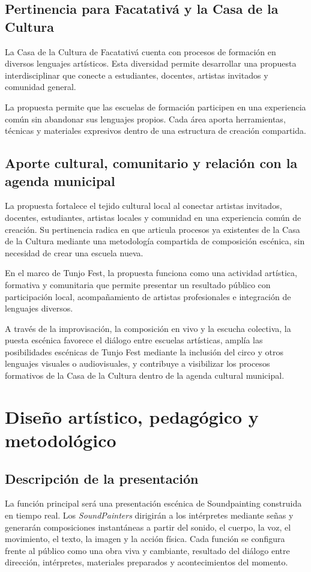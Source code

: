 \documentclass[11pt,a4paper]{article}
\newcommand{\SectionTone}{SectionBlue}
\newcommand{\setsectioncolor}[1]{\renewcommand{\SectionTone}{#1}}
\newcommand{\CurrentTOCSectionTone}{SectionBlue}
\newcommand{\settocsectioncolor}[1]{\gdef\CurrentTOCSectionTone{#1}}
\newcommand{\proposalSection}[2]{%
  \setsectioncolor{#1}%
  \addtocontents{toc}{\protect\settocsectioncolor{#1}\protect\ignorespaces}%
  \section{#2}%
}
\begin{document}
\subsection{Pertinencia para Facatativá y la Casa de la Cultura}

La Casa de la Cultura de Facatativá cuenta con procesos de formación en diversos lenguajes artísticos. Esta diversidad permite desarrollar una propuesta interdisciplinar que conecte a estudiantes, docentes, artistas invitados y comunidad general.

La propuesta permite que las escuelas de formación participen en una experiencia común sin abandonar sus lenguajes propios. Cada área aporta herramientas, técnicas y materiales expresivos dentro de una estructura de creación compartida.

\subsection{Aporte cultural, comunitario y relación con la agenda municipal}

La propuesta fortalece el tejido cultural local al conectar artistas invitados, docentes, estudiantes, artistas locales y comunidad en una experiencia común de creación. Su pertinencia radica en que articula procesos ya existentes de la Casa de la Cultura mediante una metodología compartida de composición escénica, sin necesidad de crear una escuela nueva.

En el marco de Tunjo Fest, la propuesta funciona como una actividad artística, formativa y comunitaria que permite presentar un resultado público con participación local, acompañamiento de artistas profesionales e integración de lenguajes diversos.

A través de la improvisación, la composición en vivo y la escucha colectiva, la puesta escénica favorece el diálogo entre escuelas artísticas, amplía las posibilidades escénicas de Tunjo Fest mediante la inclusión del circo y otros lenguajes visuales o audiovisuales, y contribuye a visibilizar los procesos formativos de la Casa de la Cultura dentro de la agenda cultural municipal.

\proposalSection{SectionTeal}{Diseño artístico, pedagógico y metodológico}

\subsection{Descripción de la presentación}

La función principal será una presentación escénica de Soundpainting construida en tiempo real. Los \textit{SoundPainters} dirigirán a los intérpretes mediante señas y generarán composiciones instantáneas a partir del sonido, el cuerpo, la voz, el movimiento, el texto, la imagen y la acción física. Cada función se configura frente al público como una obra viva y cambiante, resultado del diálogo entre dirección, intérpretes, materiales preparados y acontecimientos del momento.
\end{document}
